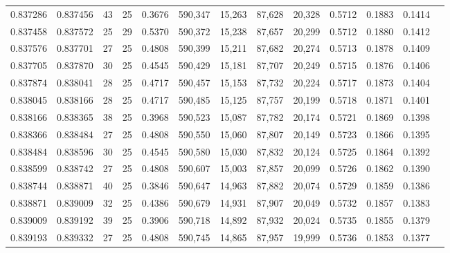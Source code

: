 \begin{tabular}{rrrrrrrrrrrrr}
0.837286 & 0.837456 &    43 &  25 &                                     0.3676 & 590,347 &  15,263 &  87,628 &  20,328 & 0.5712 & 0.1883 & 0.1414 \\
0.837458 & 0.837572 &    25 &  29 &                                     0.5370 & 590,372 &  15,238 &  87,657 &  20,299 & 0.5712 & 0.1880 & 0.1412 \\
0.837576 & 0.837701 &    27 &  25 &                                     0.4808 & 590,399 &  15,211 &  87,682 &  20,274 & 0.5713 & 0.1878 & 0.1409 \\
0.837705 & 0.837870 &    30 &  25 &                                     0.4545 & 590,429 &  15,181 &  87,707 &  20,249 & 0.5715 & 0.1876 & 0.1406 \\
0.837874 & 0.838041 &    28 &  25 &                                     0.4717 & 590,457 &  15,153 &  87,732 &  20,224 & 0.5717 & 0.1873 & 0.1404 \\
0.838045 & 0.838166 &    28 &  25 &                                     0.4717 & 590,485 &  15,125 &  87,757 &  20,199 & 0.5718 & 0.1871 & 0.1401 \\
0.838166 & 0.838365 &    38 &  25 &                                     0.3968 & 590,523 &  15,087 &  87,782 &  20,174 & 0.5721 & 0.1869 & 0.1398 \\
0.838366 & 0.838484 &    27 &  25 &                                     0.4808 & 590,550 &  15,060 &  87,807 &  20,149 & 0.5723 & 0.1866 & 0.1395 \\
0.838484 & 0.838596 &    30 &  25 &                                     0.4545 & 590,580 &  15,030 &  87,832 &  20,124 & 0.5725 & 0.1864 & 0.1392 \\
0.838599 & 0.838742 &    27 &  25 &                                     0.4808 & 590,607 &  15,003 &  87,857 &  20,099 & 0.5726 & 0.1862 & 0.1390 \\
0.838744 & 0.838871 &    40 &  25 &                                     0.3846 & 590,647 &  14,963 &  87,882 &  20,074 & 0.5729 & 0.1859 & 0.1386 \\
0.838871 & 0.839009 &    32 &  25 &                                     0.4386 & 590,679 &  14,931 &  87,907 &  20,049 & 0.5732 & 0.1857 & 0.1383 \\
0.839009 & 0.839192 &    39 &  25 &                                     0.3906 & 590,718 &  14,892 &  87,932 &  20,024 & 0.5735 & 0.1855 & 0.1379 \\
0.839193 & 0.839332 &    27 &  25 &                                     0.4808 & 590,745 &  14,865 &  87,957 &  19,999 & 0.5736 & 0.1853 & 0.1377 \\

\end{tabular}
